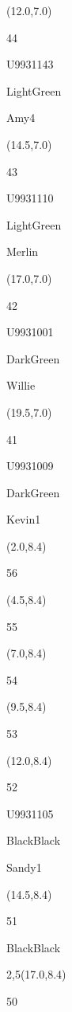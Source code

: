\documentclass[a4paper]{article}
\newcommand{\myseat}[4]{%
\vspace{-0.1cm} \hspace{-0.5cm}
\parbox[t][2.2cm][t]{3.5cm}{%
\small #1 %
\begin{description}
\vspace{-0.1cm}
\item [ID:] #2
\vspace{-0.1cm}
\item [Team:] #3 \normalsize
\vspace{-0.1cm}
\item \normalsize #4
\vspace{-0.1cm}
\end{description}
}
}
\begin{document}
\begin{textblock}{2.5}(12.0,7.0)
\myseat{44}{U9931143}{LightGreen}{Amy4}
\end{textblock}

\begin{textblock}{2.5}(14.5,7.0)
\myseat{43}{U9931110}{LightGreen}{Merlin}
\end{textblock}

\begin{textblock}{2.5}(17.0,7.0)
\myseat{42}{U9931001}{DarkGreen}{Willie}
\end{textblock}

\begin{textblock}{2.5}(19.5,7.0)
\myseat{41}{U9931009}{DarkGreen}{Kevin1}
\end{textblock}


\begin{textblock}{2.5}(2.0,8.4)
\textblockcolor{}
\myseat{56}{}{}{}
\end{textblock}

\begin{textblock}{2.5}(4.5,8.4)
\textblockcolor{}
\myseat{55}{}{}{}
\end{textblock}

\begin{textblock}{2.5}(7.0,8.4)
\textblockcolor{}
\myseat{54}{}{}{}
\end{textblock}

\begin{textblock}{2.5}(9.5,8.4)
\textblockcolor{}
\myseat{53}{}{}{}
\end{textblock}

\begin{textblock}{2.5}(12.0,8.4)
\myseat{52}{U9931105}{BlackBlack}{Sandy1}
\end{textblock}

\begin{textblock}{2.5}(14.5,8.4)
\myseat{51}{}{BlackBlack}{}
\end{textblock}

\begin{textblock}{2,5}(17.0,8.4)
\textblockcolor{}
\myseat{50}{}{}{}
\end{textblock}
\end{document}
